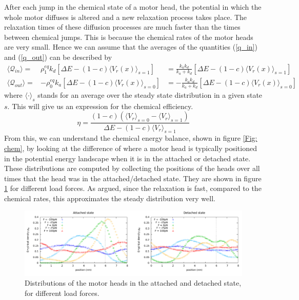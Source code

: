 \documentclass[aps,pre,onecolumn,showpacs,showkeys,a4paper]{revtex4}
\begin{document}
After each jump in the chemical state of a motor head, the potential in which the whole motor diffuses is altered and a new relaxation process takes place. 
The relaxation times of these diffusion processes are much faster than the times between chemical jumps. 
This is because the chemical rates of the motor heads are very small. 
Hence we can assume that the averages of the quantities (\ref{q_in}) and (\ref{q_out}) can be described by
\begin{eqnarray}
\langle \mathcal Q_{in} \rangle =& \rho^{eq}_1 k_d \left[\Delta E - (1-c)\langle V_r(x) \rangle_{s=1} \right] &= \frac{k_a k_d}{k_a + k_d}\left[\Delta E - (1-c)\langle V_r(x) \rangle_{s=1} \right] \label{Q_in}\\
\langle \mathcal Q_{out} \rangle =& -\rho^{eq}_0 k_a \left[\Delta E - (1-c)\langle V_r(x) \rangle_{s=0} \right] &= -\frac{k_a k_d}{k_a + k_d}\left[\Delta E - (1-c)\langle V_r(x) \rangle_{s=0} \right]\label{Q_out}
\end{eqnarray}
where $\langle \cdot \rangle_{s}$ stands for an average over the steady state distribution in a given state $s$. 
This will give us an expression for the chemical efficiency.
\begin{equation}
\eta = \frac{(1-c)\left(\langle V_r\rangle_{s=0}-\langle V_r\rangle_{s=1}\right)}{\Delta E - (1-c)\langle V_r\rangle_{s=1}}\label{eta}
\end{equation}
From this, we can understand the chemical energy balance, shown in figure \ref{Fig: chem}, by looking at the difference of where a motor head is typically positioned in the potential energy landscape when it is in the attached or detached state. 
These distributions are computed by collecting the positions of the heads over all times that the head was in the attached/detached state. 
They are shown in figure \ref{Fig: pos_distr} for different load forces. 
As argued, since the relaxation is fast, compared to the chemical rates, this approximates the steady distribution very well.
\begin{figure}[h]
\centering
\includegraphics[width=1\textwidth,height=!]{pos_distr_all_F}
\caption{Distributions of the motor heads in the attached and detached state, for different load forces.}
\label{Fig: pos_distr}
\end{figure}
\end{document}

